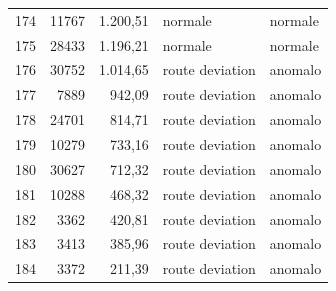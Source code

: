 {\begin{longtable}{rrrll}
174 & 11767 & 1.200,51 & normale & normale \\
175 & 28433 & 1.196,21 & normale & normale \\
\midrule
176 & 30752 & 1.014,65 & route deviation & anomalo \\
177 & 7889 & 942,09 & route deviation & anomalo \\
178 & 24701 & 814,71 & route deviation & anomalo \\
179 & 10279 & 733,16 & route deviation & anomalo \\
180 & 30627 & 712,32 & route deviation & anomalo \\
181 & 10288 & 468,32 & route deviation & anomalo \\
182 & 3362 & 420,81 & route deviation & anomalo \\
183 & 3413 & 385,96 & route deviation & anomalo \\
184 & 3372 & 211,39 & route deviation & anomalo \\
\end{longtable}
}
